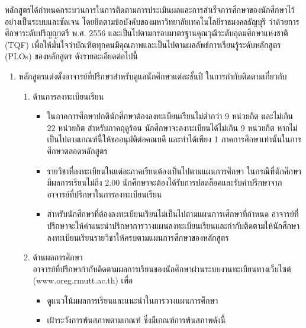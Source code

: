 \begin{doclist}
\end{doclist}


หลักสูตรได้กำหนดกระบวนการในการติดตามการประเมินผลและการสำเร็จการศึกษาของนักศึกษาไว้อย่างเป็นระบบและชัดเจน โดยยึดตามข้อบังคับของมหาวิทยาลัยเทคโนโลยีราชมงคลธัญบุรี ว่าด้วยการศึกษาระดับปริญญาตรี พ.ศ. 2556 และเป็นไปตามกรอบมาตรฐานคุณวุฒิระดับอุดมศึกษาแห่งชาติ (TQF) เพื่อให้มั่นใจว่าบัณฑิตทุกคนมีคุณภาพและเป็นไปตามผลลัพธ์การเรียนรู้ระดับหลักสูตร (PLOs) ของหลักสูตร ดังรายละเอียดต่อไปนี้ 
\begin{enumerate}
	\item หลักสูตรแต่งตั้งอาจารย์ที่ปรึกษาสำหรับดูแลนักศึกษาแต่ละชั้นปี ในการกำกับติดตามเกี่ยวกับ
	\begin{enumerate}[label=\arabic*),leftmargin=0.7cm]
		\item ด้านการลงทะเบียนเรียน
		\begin{itemize}
			\item ในภาคการศึกษาปกตินักศึกษาต้องลงทะเบียนเรียนไม่ต่ำกว่า 9 หน่วยกิต และไม่เกิน 22 หน่วยกิต สำหรับภาคฤดูร้อน นักศึกษาจะลงทะเบียนได้ไม่เกิน 9 หน่วยกิต หากไม่เป็นไปตามเกณฑ์นี้ให้ขออนุมัติต่อคณบดี และทำได้เพียง 1 ภาคการศึกษาเท่านั้นในการศึกษาตลอดหลักสูตร
			\item รายวิชาที่ลงทะเบียนในแต่ละภาคเรียนต้องเป็นไปตามแผนการศึกษา ในกรณีที่นักศึกษามีผลการเรียนไม่ถึง 2.00 นักศึกษาจะต้องได้รับการปลดล็อคและรับคำปรึกษาจากอาจารย์ที่ปรึกษาในการลงทะเบียนเรียน
			\item สำหรับนักศึกษาที่ต้องลงทะเบียนเรียนไม่เป็นไปตามแผนการเศึกษาที่กำหนด อาจารย์ที่ปรึกษาจะให้คำแนะนำปรึกษาการวางแผนลงทะเบียนเรียนและกำกับติดตามให้นักศึกษาลงทะเบียนเรียนรายวิชาให้ครบตามแผนการศึกษาของหลักสูตร
		\end{itemize}
		\item ด้านผลการศึกษา\\
		อาจารย์ที่ปรึกษากำกับติดตามผลการเรียนของนักศึกษาผ่านระบบงานทะเบียนทางเว็บไซต์ (www.oreg.rmutt.ac.th) เพื่อ
		\begin{itemize}
			\item ดูแนวโน้มผลการเรียนและแนะนำในการวางแผนการศึกษา
			\item เฝ้าระวังการพ้นสภาพตามเกณฑ์ ซึ่งมีเกณฑ์การพ้นสภาพดังนี้\\
			

\end{itemize}
\end{enumerate}
\end{enumerate}

